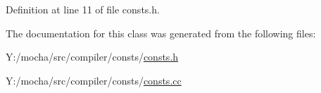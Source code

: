 Definition at line 11 of file consts.h.



The documentation for this class was generated from the following files:\begin{DoxyCompactItemize}
\item 
Y:/mocha/src/compiler/consts/\hyperlink{consts_8h}{consts.h}\item 
Y:/mocha/src/compiler/consts/\hyperlink{consts_8cc}{consts.cc}\end{DoxyCompactItemize}
